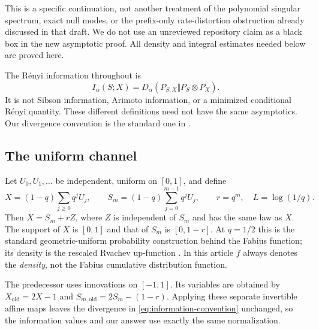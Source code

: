 \documentclass[11pt,a4paper]{article}
\numberwithin{equation}{section}
\theoremstyle{definition}\newaliascnt{definition}{theorem}
\theoremstyle{remark}\newaliascnt{remark}{theorem}
\begin{document}
This is a specific continuation, not another treatment of the polynomial
singular spectrum, exact null modes, or the prefix-only rate-distortion
obstruction already discussed in that draft. We do not use an unreviewed
repository claim as a black box in the new asymptotic proof. All density and
integral estimates needed below are proved here.

The R\'enyi information throughout is
\begin{equation}
 I_\alpha(S;X)=D_\alpha(P_{S,X}\Vert P_S\otimes P_X).
 \label{eq:information-convention}
\end{equation}
It is not Sibson information, Arimoto information, or a minimized conditional
R\'enyi quantity. These different definitions need not have the same
asymptotics. Our divergence convention is the standard one in
\cite{renyi}.

\subsection{The uniform channel}
Let $U_0,U_1,\ldots$ be independent, uniform on $[0,1]$, and define
\begin{equation}
 X=(1-q)\sum_{j\ge0}q^jU_j,
 \qquad S_m=(1-q)\sum_{j=0}^{m-1}q^jU_j,
 \qquad r=q^m,\quad L=\log(1/q).
 \label{eq:uniform-channel}
\end{equation}
Then $X=S_m+rZ$, where $Z$ is independent of $S_m$ and has the same law as
$X$. The support of $X$ is $[0,1]$ and that of $S_m$ is $[0,1-r]$.
At $q=1/2$ this is the standard geometric-uniform probability construction
behind the Fabius function; its density is the rescaled Rvachev up-function
\cite{arias}. In this article $f$ always denotes the \emph{density}, not the
Fabius cumulative distribution function.

The predecessor uses innovations on $[-1,1]$. Its variables are obtained by
$X_{\mathrm{old}}=2X-1$ and
$S_{m,\mathrm{old}}=2S_m-(1-r)$. Applying these separate invertible affine
maps leaves the divergence in \eqref{eq:information-convention} unchanged,
so the information values and our answer use exactly the same normalization.
\end{document}
